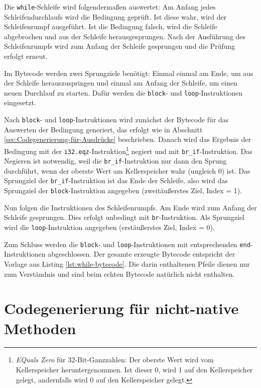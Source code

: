 Die \lstinline{while}-Schleife wird folgendermaßen auswertet: Am Anfang jedes Schleifendurchlaufs wird die Bedingung geprüft. Ist diese wahr, wird der Schleifenrumpf ausgeführt. Ist die Bedingung falsch, wird die Schleife abgebrochen und aus der Schleife herausgesprungen. Nach der Ausführung des Schleifenrumpfs wird zum Anfang der Schleife gesprungen und die Prüfung erfolgt erneut.

Im Bytecode werden zwei Sprungziele benötigt: Einmal einmal am Ende, um aus der Schleife herauszuspringen und einmal am Anfang der Schleife, um einen neuen Durchlauf zu starten. Dafür werden die \lstinline{block}- und \lstinline{loop}-Instruktionen eingesetzt.

Nach \lstinline{block}- und \lstinline{loop}-Instruktionen wird zunächst der Bytecode für das Auswerten der Bedingung generiert, das erfolgt wie in Abschnitt \ref{sec:Codegenerierung-für-Ausdrücke} beschrieben. Danach wird das Ergebnis der Bedingung mit der \lstinline{i32.eqz}-Instruktion\footnote{\emph{EQuals Zero} für 32-Bit-Ganzzahlen: Der oberste Wert wird vom Kellerspeicher heruntergenommen. Ist dieser 0, wird 1 auf den Kellerspeicher gelegt, andernfalls wird 0 auf den Kellerspeicher gelegt.} negiert und mit \lstinline{br_if}-Instruktion. Das Negieren ist notwendig, weil die \lstinline{br_if}-Instruktion nur dann den Sprung durchführt, wenn der oberste Wert am Kellerspeicher wahr (ungleich 0) ist. Das Sprungziel der \lstinline{br_if}-Instruktion ist das Ende der Schleife, also wird das Sprungziel der \lstinline{block}-Instruktion angegeben (zweitäußerstes Ziel, Index = 1).

Nun folgen die Instruktionen des Schleifenrumpfs. Am Ende wird zum Anfang der Schleife gesprungen. Dies erfolgt unbedingt mit \lstinline{br}-Instruktion. Als Sprungziel wird die \lstinline{loop}-Instruktion angegeben (erstäußerstes Ziel, Index = 0).

Zum Schluss werden die \lstinline{block}- und \lstinline{loop}-Instruktionen mit entsprechenden \lstinline{end}-In\-struk\-ti\-onen abgeschlossen. Der gesamte erzeugte Bytecode entspricht der Vorlage aus Listing \ref{lst:while-bytecode}. Die darin enthaltenen Pfeile dienen nur zum Verständnis und sind beim echten Bytecode natürlich nicht enthalten.



\section{Codegenerierung für nicht-native Methoden}

